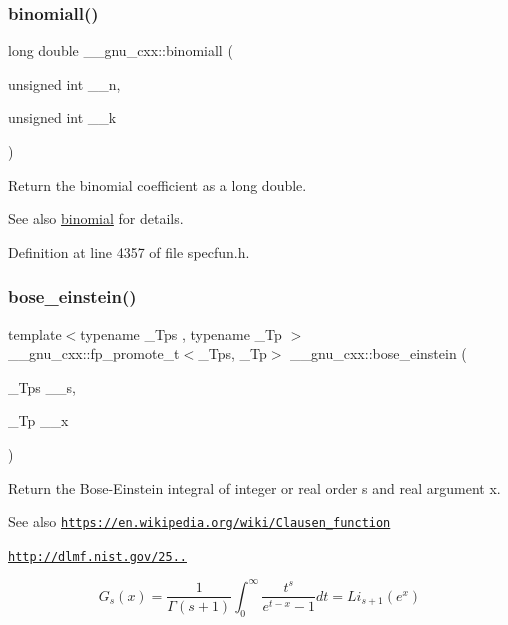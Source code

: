 \subsubsection{\texorpdfstring{binomiall()}{binomiall()}}
{\footnotesize\ttfamily long double \+\_\+\+\_\+gnu\+\_\+cxx\+::binomiall (\begin{DoxyParamCaption}\item[{unsigned int}]{\+\_\+\+\_\+n,  }\item[{unsigned int}]{\+\_\+\+\_\+k }\end{DoxyParamCaption})\hspace{0.3cm}{\ttfamily [inline]}}

Return the binomial coefficient as a {\ttfamily long double}.

\begin{DoxySeeAlso}{See also}
\hyperlink{group__mathsf__gnu_gabd0cf6e3f1e1d36c4c45f118e34a5ca2}{binomial} for details. 
\end{DoxySeeAlso}


Definition at line 4357 of file specfun.\+h.

\mbox{\label{group__mathsf__gnu_gae8135b6861a48f2cee2e692093a17102}} 
\subsubsection{\texorpdfstring{bose\+\_\+einstein()}{bose\_einstein()}}
{\footnotesize\ttfamily template$<$typename \+\_\+\+Tps , typename \+\_\+\+Tp $>$ \\
\+\_\+\+\_\+gnu\+\_\+cxx\+::fp\+\_\+promote\+\_\+t$<$\+\_\+\+Tps, \+\_\+\+Tp$>$ \+\_\+\+\_\+gnu\+\_\+cxx\+::bose\+\_\+einstein (\begin{DoxyParamCaption}\item[{\+\_\+\+Tps}]{\+\_\+\+\_\+s,  }\item[{\+\_\+\+Tp}]{\+\_\+\+\_\+x }\end{DoxyParamCaption})\hspace{0.3cm}{\ttfamily [inline]}}

Return the Bose-\/\+Einstein integral of integer or real order s and real argument x. \begin{DoxySeeAlso}{See also}
\href{https://en.wikipedia.org/wiki/Clausen_function}{\tt https\+://en.\+wikipedia.\+org/wiki/\+Clausen\+\_\+function} 

\href{http://dlmf.nist.gov/25.12.16}{\tt http\+://dlmf.\+nist.\+gov/25..}
\end{DoxySeeAlso}
\[ G_s(x) = \frac{1}{\Gamma(s+1)}\int_0^\infty \frac{t^s}{e^{t-x} - 1}dt = Li_{s+1}(e^x) \]


